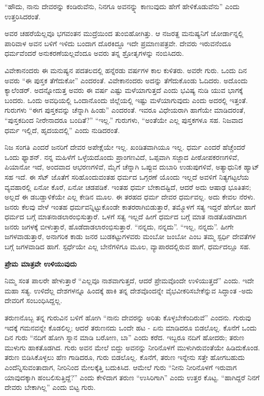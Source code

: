 “ಹೌದು, ನಾನು ದೇವರನ್ನು ಕಂಡಿರುವೆನು, ನಿನಗೂ ಅವನನ್ನ್ನು ಕಾಣುವುದು ಹೇಗೆ ಹೇಳಿಕೊಡುವೆನು” ಎಂದು ಉತ್ತರಿಸಿದರಂತೆ.

ಅವರ ಚಹರೆಯೆಲ್ಲವೂ ಭಗವಂತನ ಮುದ್ರೆಯಿಂದ ತುಂಬಿಹೋಗಿತ್ತು. ಆ ನಜರತ್ದ ಮನುಷ್ಯನಿಗೆ ಜೋರ್ಡಾನ್ನಲ್ಲಿ ಪಾರಿವಾಳ ಅವನ ಬಳಿಗೆ ಇಳಿದು ಬಂದಾಗ ದೊರಕಿದ್ದೂ ಇದೇ ಪ್ರಮಾಣಪತ್ರವೇ. ದೇವರು ಇರುವನೆಂದೂ ಧರ್ಮವೆಂದರೆ ಅನುಕರಣೆಯಲ್ಲವೆಂದೂ ಅವರು ತನ್ನ ಶ್ರೋತೃಗಳನ್ನು ನಂಬಿಸಿದರು.

ವಿವೇಕಾನಂದರು ಈ ಮನುಷ್ಯನ ಪದತಲದಲ್ಲಿ ಹನ್ನೆರಡು ವರ್ಷಗಳ ಕಾಲ ಕುಳಿತರು. ಅವರೇ ಗುರು. ಒಂದು ದಿನ ಅವರು “ಈ ಪುಸ್ತಕ ತೆಗೆದುಕೋ” ಎಂದರಂತೆ. ವಿವೇಕಾನಂದರು ಅದನ್ನು ತೆಗೆದುಕೊಂಡು ಓದಿದರು. ಅದೊಂದು ಕ್ಯಾಲೆಂಡರ್. ಅದನ್ನೋದುತ್ತ ಅವರು ಈ ವರ್ಷ ಎಷ್ಟು ಮಳೆಯಾಗುತ್ತದೆ ಎಂದು ಭವಿಷ್ಯ ನುಡಿ ಯುವ ಭಾಗಕ್ಕೆ ಬಂದರು. ಒಂದು ಅವಧಿಯಲ್ಲಿ ಒಂದಾನೊಂದು ಜಿಲ್ಲೆಯಲ್ಲಿ ಇಷ್ಟು ಮಳೆಯಾಗುವುದು ಎಂದು ಅದರಲ್ಲಿ ಇತ್ತಂತೆ. ಗುರುಗಳು “ಈಗ ಪುಸ್ತಕವನ್ನು ಚೆನ್ನಾಗಿ ಹಿಂಡು” ಎಂದರಂತೆ. ಇವರೂ ವಿಧೇಯರಾಗಿ ಹಾಗೆಯೇ ಮಾಡಿದರಂತೆ, “ಪುಸ್ತಕದಿಂದ ನೀರೇನಾದರೂ ಬಂದಿತೆ?” “ಇಲ್ಲ.” ಗುರುಗಳು, “ಅಂತೆಯೇ ಎಲ್ಲ ಪುಸ್ತಕಗಳೂ ಸಹ. ನಿಜವಾದ ಧರ್ಮ ಇಲ್ಲಿದೆ, ಹೃದಯದಲ್ಲಿ” ಎಂದು ನುಡಿದರಂತೆ.

ನಿಜ ಸಂಗತಿ ಎಂದರೆ ಜನರಿಗೆ ದೇವರ ಅಪೇಕ್ಷೆಯೇ ಇಲ್ಲ. ಖಂಡಿತವಾಗಿಯೂ ಇಲ್ಲ. ಧರ್ಮ ಎಂದರೆ ಹೆಚ್ಚೆಂದರೆ ಒಂದು ಫ್ಯಾಶನ್. ನನ್ನ ಮಹಿಳೆಗೆ ಒಳ್ಳೆಯದೊಂದು ಪ್ರಾಂಗಣವಿದೆ, ಒಪ್ಪವಾಗಿ ಸಜ್ಜಾದ ಪೀಠೋಪಕರಣಗಳಿವೆ, ಪಿಯಾನೋ ಇದೆ, ಅಂದವಾದ ಆಭರಣಗಳಿವೆ, ಮೈಗೆ ಚೆನ್ನಾಗಿ ಒಪ್ಪುವ ದುಬಾರಿ ಉಡುಪುಗಳಿವೆ, ಅತ್ಯಾಧುನಿಕ ಹ್ಯಾಟ್ ಸಹ ಇದೆ. ಈ ಸೆಟ್ ಜೊತೆಗೆ ಸರಿಹೊಂದುವಂತಹ ಧರ್ಮದ ಒಗ್ಗರಣೆ ಯೊಂದು ಇಲ್ಲದೆ ಅವಳಿಗೆ ನಿತ್ಯಗಟ್ಟಲೆಯ ವ್ಯವಹಾರಲ್ಲಿ ಏನೋ ಕೊರೆ, ಏನೋ ಚಡಪಡಿಕೆ. ಇಂತಹ ಧರ್ಮ ಬೇಕಾದಷ್ಟಿದೆ, ಆದರೆ ಅದು ಆಷಾಢ ಭೂತಿತನ; ಅಲ್ಲದೆ ಈ ಡಬಡ್ಡಾಳಿಕೆಯೇ ಎಲ್ಲ ಕೇಡಿನ ಮೂಲ. ಈ ತರಹದ ಧರ್ಮ ದೇವರ ಧರ್ಮವಲ್ಲ. ಅದು ಕೇವಲ ನೆರಳು. ಜನರು ಕೆಲವು ವೇಳೆ ಇಂತಹ ಧರ್ಮವನ್ನಿಟ್ಟುಕೊಂಡೇ ಕಾತರರಾಗಿಬಿಡುತ್ತಾರೆ, ತಮ್ಮೊಳಗೆ ಸತ್ಯ ಇದ್ದರೆ ಹೇಗೋ ಹಾಗೆ ಧರ್ಮದ ಬಗ್ಗೆ ಮಾತನಾಡಲಾರಂಭಿಸುತ್ತಾರೆ. ಒಳಗೆ ಸತ್ವ ಇಲ್ಲದೆ ಹೀಗೆ ಧರ್ಮದ ಬಗ್ಗೆ ಮಾತ ನಾಡತೊಡಗಿದಾಗ ಜನರು ಜಗಳಕ್ಕೆ ಬೀಳುತ್ತಾರೆ, ಹೊಡೆದಾಡಲಾರಂಭಿಸುತ್ತಾರೆ. “ನನ್ನದು, ನನ್ನದು”. “ಇಲ್ಲ, ನನ್ನದು”. ಹೀಗೇ ಜಗಳವಾಡುತ್ತಾರೆ, ಅನಾಗರಿಕ ಕಾಡು ಜನರ ಬುಡಕಟ್ಟುಗಳವರು ಮಂಬೋ ಜಂಬೋ ಎಂಬ ತಮ್ಮ ಸ್ಪರ್ಧಿ ದೇವತೆಗಳ ಬಗ್ಗೆ ಜಗಳವಾಡಿದ ಹಾಗೆ. ಸ್ಪರ್ಧೆಯೇ ಎಲ್ಲ ಬೇನೆಗಳಿಗೂ ಮೂಲ, ವ್ಯಾಪಾರದಲ್ಲಿರುವ ಹಾಗೆ, ಧರ್ಮದಲ್ಲೂ ಸಹ.

\begin{center}
\textbf{ಪ್ರೇಮ ಮಾತ್ರವೇ ಉಳಿಯುವುದು}
\end{center}

ನಿಮ್ಮ ಸಂತ ಪಾಲರೇ ಹೇಳುತ್ತಾರೆ “ಎಲ್ಲವೂ ನಾಶವಾಗುತ್ತದೆ, ಆದರೆ ಪ್ರೇಮವೊಂದೇ ಉಳಿಯುತ್ತದೆ” ಎಂದು. ಇದೇ ಮಹಾ ಸತ್ಯ. ಉಳಿದೆಲ್ಲ ದೇಶಗಳನ್ನೂ ಹಿಂದಕ್ಕೆ ಹಾಕಿ ತನ್ನ ದೇಶವೊಂದನ್ನೇ ವೈಭವೀಕರಿಸಬೇಕೆನ್ನುವ ಸಿದ್ಧಾಂತ -ಅದು ದೇವರಿಗೆ ಸಂಬಂಧಿಸಿದ್ದಲ್ಲ.

ತರುಣನೊಬ್ಬ ತನ್ನ ಗುರುವಿನ ಬಳಿಗೆ ಹೋಗಿ “ನಾನು ದೇವರನ್ನು ಅರಿತು ಕೊಳ್ಳಬೇಕೆಂದಿರುವೆ” ಎಂದನು. ಗುರುವು ಇದಕ್ಕೆ ಗಮನವನ್ನೇ ಕೊಡಲಿಲ್ಲ; ಆದರೆ ತರುಣನದು ಒಂದೇ ಹಟ - ಏನು ಮಾಡಿದರೂ ಬಿಡಲೊಲ್ಲ. ಕೊನೆಗೆ ಒಂದು ದಿನ ಗುರು “ನದಿಗೆ ಹೋಗಿ ಸ್ನಾನ ಮಾಡಿ ಬರೋಣ, ಬಾ” ಎಂದು ಕರೆದ. ಇಬ್ಬರೂ ನದಿಗೆ ಹೋದರು; ತರುಣ ಮುಳುಗು ಹಾಕತೊಡಗಿದ. ಗುರು ಅವನ ಮೇಲೆ ಬಿದ್ದು ಅವನನ್ನು ನೀರಿನೊಳಗೆ ಮುಳುಗಿರುವಂತೆಯೇ ಹಿಡಿದುಕೊಂಡ. ತರುಣ ಬಿಡಿಸಿಕೊಳ್ಳಲು ಹೆಣ ಗಾಡಿದರೂ, ಗುರು ಬಿಡಲೊಲ್ಲ. ಕೊನೆಗೆ, ತರುಣ ಇನ್ನೇನು ಸತ್ತೇ ಹೋಗಬಹುದು ಎಂದೆನ್ನಿಸುವಂತಾದಾಗ, ನೀರಿನಿಂದ ಮೇಲಕ್ಕೆತ್ತಿ ಬದುಕಿಸಿದ. ಆಮೇಲೆ ಗುರು “ನೀನು ನೀರಿನೊಳಗೆ ಇರುವಾಗ ಯಾವುದಕ್ಕಾಗಿ ಹಂಬಲಿಸುತ್ತಿದ್ದೆ?” ಎಂದು ಕೇಳಿದಾಗ ತರುಣ “ಉಸಿರಿಗಾಗಿ” ಎಂದು ಉತ್ತರ ಕೊಟ್ಟ. “ಹಾಗಿದ್ದರೆ ನಿನಗೆ ದೇವರು ಬೇಕಾಗಿಲ್ಲ” ಎಂದು ಬಿಟ್ಟ ಗುರು.

